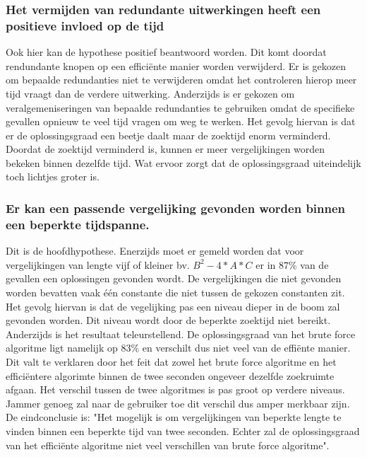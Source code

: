 \documentclass[Main.tex]{subfiles}
\begin{document}
\subsubsection{Het vermijden van redundante uitwerkingen heeft een positieve invloed op de tijd}
Ook hier kan de hypothese positief beantwoord worden. Dit komt doordat rendundante knopen op een effici\"ente manier worden verwijderd. Er is gekozen om bepaalde redundanties niet te verwijderen omdat het controleren hierop meer tijd vraagt dan de verdere uitwerking. Anderzijds is er gekozen om veralgemeniseringen van bepaalde redundanties te gebruiken omdat de specifieke gevallen opnieuw te veel tijd vragen om weg te werken. Het gevolg hiervan is dat er de oplossingsgraad een beetje daalt maar de zoektijd enorm verminderd. Doordat de zoektijd verminderd is, kunnen er meer vergelijkingen worden bekeken binnen dezelfde tijd. Wat ervoor zorgt dat de oplossingsgraad uiteindelijk toch lichtjes groter is.
\subsubsection{Er kan een passende vergelijking gevonden worden binnen een beperkte tijdspanne.}
Dit is de hoofdhypothese. Enerzijds moet er gemeld worden dat voor vergelijkingen van lengte vijf of kleiner bv. $B^{2} - 4 \ast A \ast C$ er in $87\%$ van de gevallen een oplossingen gevonden wordt. De vergelijkingen die niet gevonden worden bevatten vaak \'e\'en constante die niet tussen de gekozen constanten zit. Het gevolg hiervan is dat de vegelijking pas een niveau dieper in de boom zal gevonden worden. Dit niveau wordt door de beperkte zoektijd niet bereikt. Anderzijds is het resultaat teleurstellend. De oplossingsgraad van het brute force algoritme ligt namelijk op $83\%$ en verschilt dus niet veel van de effi\"ente manier. Dit valt te verklaren door het feit dat zowel het brute force algoritme en het effici\"entere algorimte binnen de twee seconden ongeveer dezelfde zoekruimte afgaan. Het verschil tussen de twee algoritmes is pas groot op verdere niveaus. Jammer genoeg zal naar de gebruiker toe dit verschil dus amper merkbaar zijn. De eindconclusie is: "Het mogelijk is om vergelijkingen van beperkte lengte te vinden binnen een beperkte tijd van twee seconden. Echter zal de oplossingsgraad van het effici\"ente algoritme niet veel verschillen van brute force algoritme".
\end{document}
